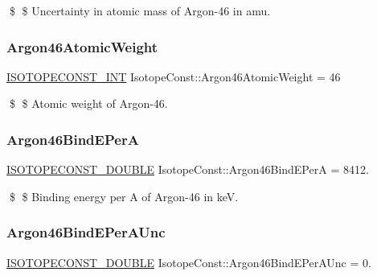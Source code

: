 \$ \$ Uncertainty in atomic mass of Argon-\/46 in amu. \mbox{\label{group___isotope_const-_argon-_ar46_ga1f5f5754d4d78b645d64697456849c66}} 
\subsubsection{\texorpdfstring{Argon46\+Atomic\+Weight}{Argon46AtomicWeight}}
{\footnotesize\ttfamily \mbox{\hyperlink{group___isotope_const-_macros_ga5f18360b3e99483a35c32d789e62621c}{I\+S\+O\+T\+O\+P\+E\+C\+O\+N\+S\+T\+\_\+\+I\+NT}} Isotope\+Const\+::\+Argon46\+Atomic\+Weight = 46}

\$ \$ Atomic weight of Argon-\/46. \mbox{\label{group___isotope_const-_argon-_ar46_ga74d7f41e34476e52972ab96b01cde498}} 
\subsubsection{\texorpdfstring{Argon46\+Bind\+E\+PerA}{Argon46BindEPerA}}
{\footnotesize\ttfamily \mbox{\hyperlink{group___isotope_const-_macros_ga8f45a7272ce02c0b4c65c44636ed719a}{I\+S\+O\+T\+O\+P\+E\+C\+O\+N\+S\+T\+\_\+\+D\+O\+U\+B\+LE}} Isotope\+Const\+::\+Argon46\+Bind\+E\+PerA = 8412.}

\$ \$ Binding energy per A of Argon-\/46 in keV. \mbox{\label{group___isotope_const-_argon-_ar46_gaa524e093034f11a2d03a850f66f0226e}} 
\subsubsection{\texorpdfstring{Argon46\+Bind\+E\+Per\+A\+Unc}{Argon46BindEPerAUnc}}
{\footnotesize\ttfamily \mbox{\hyperlink{group___isotope_const-_macros_ga8f45a7272ce02c0b4c65c44636ed719a}{I\+S\+O\+T\+O\+P\+E\+C\+O\+N\+S\+T\+\_\+\+D\+O\+U\+B\+LE}} Isotope\+Const\+::\+Argon46\+Bind\+E\+Per\+A\+Unc = 0.}

